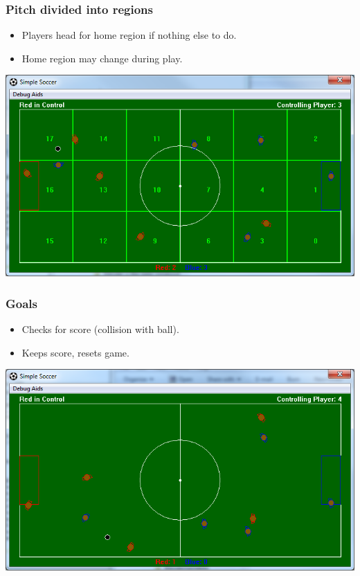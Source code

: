 \documentclass[handout,t,compress]{beamer}
\newcommand{\bframe}[1]{\begin{frame}[fragile]\frametitle{#1}}
\begin{document}
\bframe{Pitch divided into regions}
\begin{itemize}
\item Players head for home region if nothing else to do.
\item Home region may change during play.
\end{itemize}
\includegraphics[scale=0.4]{simplesoccerregions.png}
\end{frame}

\bframe{Goals}
\begin{itemize}
\item Checks for score (collision with ball).
\item Keeps score, resets game.
\end{itemize}
\includegraphics[scale=0.4]{simplesoccergame.png}
\end{frame}
\end{document}
